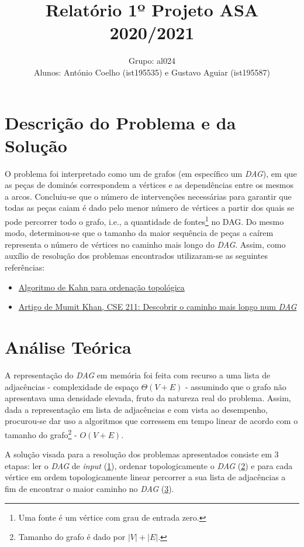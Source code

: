 \documentclass[12pt]{article}
\author{
	Grupo: al024\\Alunos: António Coelho (ist195535) e Gustavo Aguiar (ist195587)
}
\title{Relatório 1º Projeto ASA 2020/2021}
\date{}
\begin{document}
\maketitle
\section{Descrição do Problema e da Solução}
O problema foi interpretado como um de grafos (em específico um \emph{DAG}), em que as peças de dominós correspondem a vértices e as dependências entre os mesmos a arcos. Concluiu-se que o número de intervenções necessárias para garantir que todas as peças caiam é dado pelo menor número de vértices a partir dos quais se pode percorrer todo o grafo, i.e., a quantidade de fontes\footnote{Uma fonte é um vértice com grau de entrada zero.} no DAG. Do mesmo modo, determinou-se que o tamanho da maior sequência de peças a caírem representa o número de vértices no caminho mais longo do \emph{DAG}.
Assim, como auxílio de resolução dos problemas encontrados utilizaram-se as seguintes referências:
\begin{itemize}
\item\href{https://www.geeksforgeeks.org/topological-sorting-indegree-based-solution/}{Algoritmo de Kahn para ordenação topológica}
\item\href{https://www.mathcs.emory.edu/~cheung/Courses/171/Syllabus/11-Graph/Docs/longest-path-in-dag.pdf}{Artigo de Mumit Khan, CSE 211: Descobrir o caminho mais longo num \emph{DAG}}
\end{itemize}
 
 \section{Análise Teórica}
A representação do \emph{DAG} em memória foi feita com recurso a uma lista de adjacências - complexidade de espaço $\Theta{(V+E)}$ - assumindo que o grafo não apresentava uma densidade elevada, fruto da natureza real do problema. Assim, dada a representação em lista de adjacências e com vista ao desempenho, procurou-se dar uso a algoritmos que corressem em tempo linear de acordo com o tamanho do grafo\footnote{Tamanho do grafo é dado por \href{https://bit.ly/3gfDEJJ}{$\left|V\right|+\left|E\right|$}.} - $O(V+E)$.

A solução visada para a resolução dos problemas apresentados consiste em 3 etapas: ler o \emph{DAG} de \emph{input} (\underline{1}), ordenar topologicamente o \emph{DAG} (\underline{2}) e para cada vértice em ordem topologicamente linear percorrer a sua lista de adjacências a fim de encontrar o maior caminho no \emph{DAG} (\underline{3}).
\end{document}
